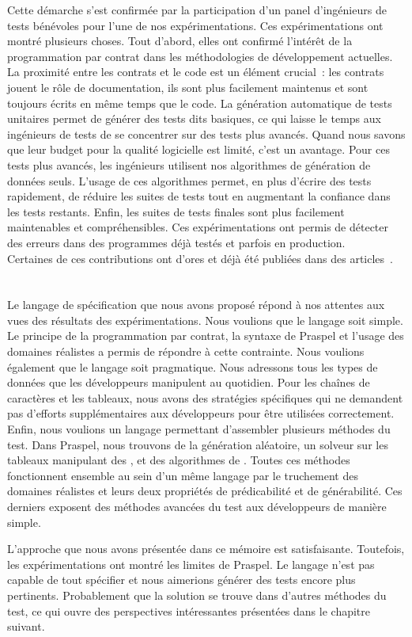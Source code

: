Cette démarche s'est confirmée par la participation d'un panel d'ingénieurs de
tests bénévoles pour l'une de nos expérimentations. Ces expérimentations ont
montré plusieurs choses. Tout d'abord, elles ont confirmé l'intérêt de la
programmation par contrat dans les méthodologies de développement actuelles. La
proximité entre les contrats et le code est un élément crucial~: les contrats
jouent le rôle de documentation, ils sont plus facilement maintenus et sont
toujours écrits en même temps que le code. La génération automatique de tests
unitaires permet de générer des tests dits basiques, ce qui laisse le temps aux
ingénieurs de tests de se concentrer sur des tests plus avancés. Quand nous
savons que leur budget pour la qualité logicielle est limité, c'est un avantage.
Pour ces tests plus avancés, les ingénieurs utilisent nos algorithmes de
génération de données seuls. L'usage de ces algorithmes permet, en plus d'écrire
des tests rapidement, de réduire les suites de tests tout en augmentant la
confiance dans les tests restants. Enfin, les suites de tests finales sont plus
facilement maintenables et compréhensibles. Ces expérimentations ont permis de
détecter des erreurs dans des programmes déjà testés et parfois en production.
\\

Certaines de ces contributions ont d'ores et déjà été publiées dans des
articles~.

\section{}
\label{section:conclusions:summa}

Le langage de spécification que nous avons proposé répond à nos attentes aux
vues des résultats des expérimentations. Nous voulions que le langage soit
simple. Le principe de la programmation par contrat, la syntaxe de Praspel et
l'usage des domaines réalistes a permis de répondre à cette contrainte. Nous
voulions également que le langage soit pragmatique. Nous adressons tous les
types de données que les développeurs manipulent au quotidien. Pour les chaînes
de caractères et les tableaux, nous avons des stratégies spécifiques qui ne
demandent pas d'efforts supplémentaires aux développeurs pour être utilisées
correctement. Enfin, nous voulions un langage permettant d'assembler plusieurs
méthodes du test. Dans Praspel, nous trouvons de la génération aléatoire, un
solveur sur les tableaux manipulant des , et des algorithmes de . Toutes ces
méthodes fonctionnent ensemble au sein d'un même langage par le truchement des
domaines réalistes et leurs deux propriétés de prédicabilité et de générabilité.
Ces derniers exposent des méthodes avancées du test aux développeurs de manière
simple.

L'approche que nous avons présentée dans ce mémoire est satisfaisante.
Toutefois, les expérimentations ont montré les limites de Praspel. Le langage
n'est pas capable de tout spécifier et nous aimerions générer des tests encore
plus pertinents. Probablement que la solution se trouve dans d'autres méthodes
du test, ce qui ouvre des perspectives intéressantes présentées dans le chapitre
suivant.
